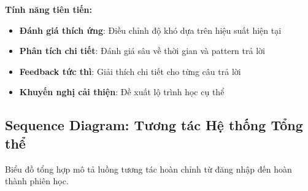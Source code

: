 \textbf{Tính năng tiên tiến:}
\begin{itemize}
    \item \textbf{Đánh giá thích ứng}: Điều chỉnh độ khó dựa trên hiệu suất hiện tại
    \item \textbf{Phân tích chi tiết}: Đánh giá sâu về thời gian và pattern trả lời
    \item \textbf{Feedback tức thì}: Giải thích chi tiết cho từng câu trả lời
    \item \textbf{Khuyến nghị cải thiện}: Đề xuất lộ trình học cụ thể
\end{itemize}

\subsection{Sequence Diagram: Tương tác Hệ thống Tổng thể}
\label{subsec:complete-system-sequence}

Biểu đồ tổng hợp mô tả luồng tương tác hoàn chỉnh từ đăng nhập đến hoàn thành phiên học.

